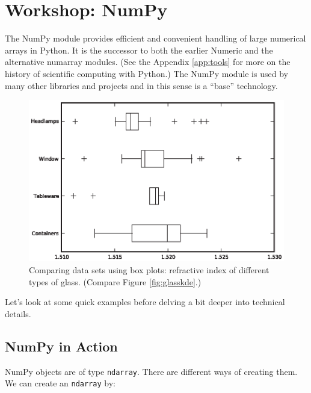\section{Workshop: NumPy}

 
The NumPy module provides efficient and convenient handling of large
numerical arrays in Python.  It is the successor to both the earlier
Numeric and the alternative numarray modules. (See the Appendix
\ref{app:tools} for more on the history of scientific computing with
Python.) The NumPy module is used by many other libraries and projects
and in this sense is a ``base'' technology.

\begin{figure}
\vspace*{-6pt}
  \centerline{\includegraphics{img/glass-boxplot}}\vspace*{-6pt}
  \caption{Comparing data sets using box plots: refractive index of 
    different types of glass. (Compare Figure \ref{fig:glasskde}.)}
  \label{fig:glassboxplot}\vspace*{-6pt}
\end{figure}

Let's look at some quick examples before delving a bit deeper into
technical details.

\vspace*{-9pt}
\subsection{NumPy in Action}

NumPy objects are of type \texttt{ndarray}.  There are different ways
of creating them. We can create an \texttt{ndarray} by:

